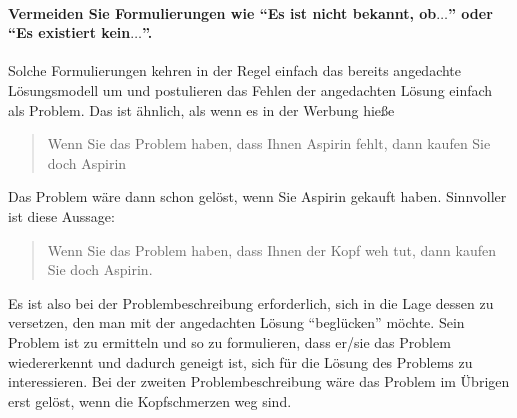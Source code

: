 \documentclass[headsepline,titlepage,twoside,12pt]{report}
\begin{document}
\paragraph{Vermeiden Sie Formulierungen wie \enquote{Es ist nicht bekannt, ob$\ldots$} oder \enquote{Es existiert kein$\ldots$}.}
Solche Formulierungen kehren in der Regel einfach das bereits angedachte Lösungsmodell um und postulieren das Fehlen der angedachten Lösung einfach als Problem.
Das ist ähnlich, als wenn es in der Werbung hieße \blockquote{Wenn Sie das Problem haben, dass Ihnen Aspirin fehlt, dann kaufen Sie doch Aspirin}.
Das Problem wäre dann schon gelöst, wenn Sie Aspirin gekauft haben.
Sinnvoller ist diese Aussage:
\blockquote{Wenn Sie das Problem haben, dass Ihnen der Kopf weh tut, dann kaufen Sie doch Aspirin.}
Es ist also bei der Problembeschreibung erforderlich, sich in die Lage dessen zu versetzen, den man mit der angedachten Lösung \enquote{beglücken} möchte.
Sein Problem ist zu ermitteln und so zu formulieren, dass er/sie das Problem wiedererkennt und dadurch geneigt ist, sich für die Lösung des Problems zu interessieren.
Bei der zweiten Problembeschreibung wäre das Problem im Übrigen erst gelöst, wenn die Kopfschmerzen weg sind.
\end{document}
